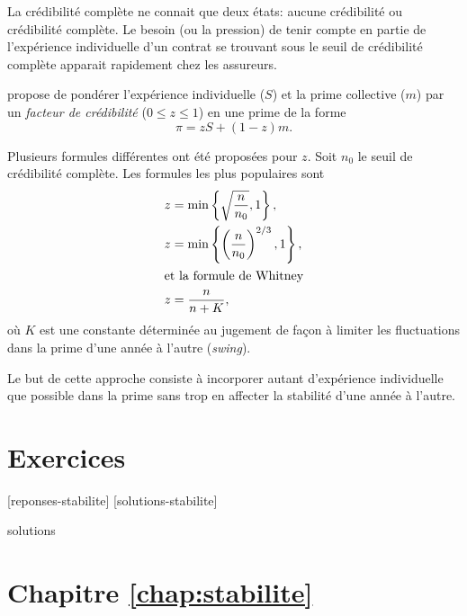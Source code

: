 La crédibilité complète ne connait que deux états: aucune crédibilité
ou crédibilité complète. Le besoin (ou la pression) de tenir compte en
partie de l'expérience individuelle d'un contrat se trouvant sous le
seuil de crédibilité complète apparait rapidement chez les assureurs.

\citet{Whitney:1918} propose de pondérer l'expérience individuelle
($S$) et la prime collective ($m$) par un \emph{facteur de
  crédibilité} ($0 \leq z \leq 1$) en une prime de la forme
\begin{equation*}
  \pi = z S + (1 - z) m.
\end{equation*}

Plusieurs formules différentes ont été proposées pour $z$. Soit $n_0$
le seuil de crédibilité complète. Les formules les plus populaires
sont
\begin{align*}
  z &= \min \left\{ \sqrt{\frac{n}{n_0}}, 1 \right\}, \\
  z &= \min \left\{ \left( \frac{n}{n_0} \right)^{2/3}, 1 \right\}, \\
  \intertext{et la formule de Whitney}
  z &= \frac{n}{n + K},
\end{align*}
où $K$ est une constante déterminée au jugement de façon à limiter les
fluctuations dans la prime d'une année à l'autre (\emph{swing}).

Le but de cette approche consiste à incorporer autant d'expérience
individuelle que possible dans la prime sans trop en affecter la
stabilité d'une année à l'autre.



\section{Exercices}
\label{sec:stabilite:exercices}

[reponses-stabilite]
[solutions-stabilite]

\begin{Filesave}{solutions}
\section*{Chapitre \ref*{chap:stabilite}}

\end{Filesave}

